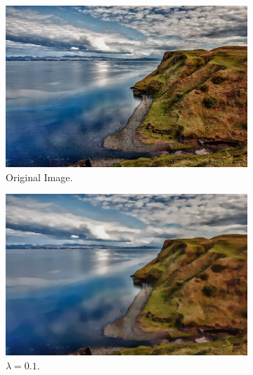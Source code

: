 \documentclass[abstracton]{scrreprt}
\begin{document}
            \begin{figure}[!ht]
                \centering
                \begin{subfigure}[b]{0.4\textwidth}
                    \includegraphics[width=\textwidth]{img/images/landscape.png}
                    \caption{Original Image.}
                \end{subfigure}
                \begin{subfigure}[b]{0.4\textwidth}
                    \includegraphics[width=\textwidth]{img/approximation/01landscape.png}
                    \caption{$\lambda = 0.1$.}
                \end{subfigure}
                \begin{subfigure}[b]{0.4\textwidth}

\end{subfigure}
\end{figure}
\end{document}
